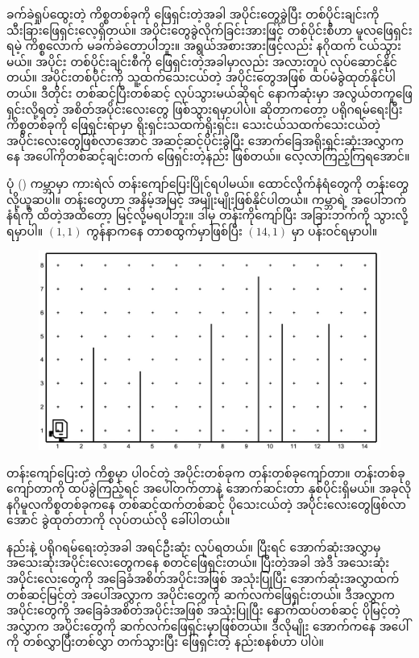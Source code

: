 ခက်ခဲရှုပ်ထွေးတဲ့ ကိစ္စတစ်ခုကို ဖြေရှင်းတဲ့အခါ အပိုင်းတွေခွဲပြီး တစ်ပိုင်းချင်းကို သီးခြားဖြေရှင်းလေ့ရှိတယ်။ အပိုင်းတွေခွဲလိုက်ခြင်းအားဖြင့် တစ်ပိုင်းစီဟာ မူလဖြေရှင်းရမဲ့ ကိစ္စ‌လောက် မခက်ခဲတော့ပါဘူး။ အရွယ်အစားအားဖြင့်လည်း နဂိုထက် ငယ်သွားမယ်။ အပိုင်း တစ်ပိုင်းချင်းစီကို ဖြေရှင်းတဲ့အခါမှာလည်း အလားတူပဲ လုပ်ဆောင်နိုင်တယ်။ အပိုင်းတစ်ပိုင်းကို သူ့ထက်သေးငယ်တဲ့ အပိုင်းတွေအဖြစ် ထပ်မံခွဲထုတ်နိုင်ပါတယ်။ ဒီတိုင်း တစ်ဆင့်ပြီးတစ်ဆင့် လုပ်သွားမယ်ဆိုရင် နောက်ဆုံးမှာ အလွယ်တကူဖြေရှင်းလို့ရတဲ့ အစိတ်အပိုင်းလေးတွေ ဖြစ်သွားရမှာပါပဲ။  ဆိုတာကတော့ ပရိုဂရမ်ရေးပြီး ကိစ္စတစ်ခုကို ဖြေရှင်းရာမှာ ရိုးရှင်းသထက်ရိုးရှင်း၊ သေးငယ်သထက်သေးငယ်တဲ့ အပိုင်းလေးတွေဖြစ်လာအောင် အဆင့်ဆင့်ပိုင်းခွဲပြီး အောက်ခြေအရိုးရှင်းဆုံးအလွှာကနေ အပေါ်ကိုတစ်ဆင့်ချင်းတက် ဖြေရှင်းတဲ့နည်း ဖြစ်တယ်။ လေ့လာကြည့်ကြရအောင်။

ပုံ (\fRefNo{\ref{fig:hurdle_jumping_init}}) ကမ္ဘာမှာ ကားရဲလ် တန်းကျော်ပြေးပြိုင်ရပါမယ်။ ထောင်လိုက်နံရံတွေကို တန်းတွေလို့ယူဆပါ။ တန်းတွေဟာ အနိမ့်အမြင့် အမျိုးမျိုးဖြစ်နိုင်ပါတယ်။ ကမ္ဘာရဲ့ အပေါ်ဘက် နံရံကို ထိတဲ့အထိတော့ မြင့်လို့မရပါဘူး။ ဒါမှ တန်းကိုကျော်ပြီး အခြားဘက်ကို သွားလို့ရမှာပါ။ \((1, 1)\) ကွန်နာကနေ တာစထွက်မှာဖြစ်ပြီး \((14, 1)\) မှာ ပန်းဝင်ရမှာပါ။
%
\begin{figure}[htb!]
    \includegraphics[width=4.5in]{images/ch03/hurdle_jumping/init_w1.jpg}
    \caption{}
    \label{fig:hurdle_jumping_init}
\end{figure}
%

တန်းကျော်ပြေးတဲ့ ကိစ္စမှာ ပါဝင်တဲ့ အပိုင်းတစ်ခုက တန်းတစ်ခုကျော်တာ။ တန်းတစ်ခု ကျော်တာကို ထပ်ခွဲကြည့်ရင် အပေါ်တက်တာနဲ့ အောက်ဆင်းတာ နှစ်ပိုင်းရှိမယ်။ အခုလို နဂိုမူလကိစ္စတစ်ခုကနေ တစ်ဆင့်ထက်တစ်ဆင့် ပိုသေးငယ်တဲ့ အပိုင်းလေးတွေဖြစ်လာအောင် ခွဲထုတ်တာကို  လုပ်တယ်လို ခေါ်ပါတယ်။ 

 နည်းနဲ့ ပရိုဂရမ်ရေးတဲ့အခါ  အရင်ဦးဆုံး  လုပ်ရတယ်။ ပြီးရင် အောက်ဆုံးအလွှာမှ အသေးဆုံးအပိုင်းလေးတွေကနေ စတင်ဖြေရှင်းတယ်။ ပြီးတဲ့အခါ အဲဒီ အသေးဆုံး အပိုင်းလေးတွေကို အခြေခံအစိတ်အပိုင်းအဖြစ် အသုံးပြုပြီး  အောက်ဆုံးအလွှာထက် တစ်ဆင့်မြင့်တဲ့ အပေါ်အလွှာက အပိုင်းတွေကို ဆက်လက်ဖြေရှင်းတယ်။ ဒီအလွှာက အပိုင်းတွေကို  အခြေခံအစိတ်အပိုင်းအဖြစ် အသုံးပြုပြီး နောက်ထပ်တစ်ဆင့် ပိုမြင့်တဲ့အလွှာက အပိုင်းတွေကို ဆက်လက်ဖြေရှင်းမှာဖြစ်တယ်။ ဒီလိုမျိုး အောက်ကနေ အပေါ်ကို တစ်လွှာပြီးတစ်လွှာ တက်သွားပြီး ဖြေရှင်းတဲ့ နည်းစနစ်ဟာ  ပါပဲ။ 


